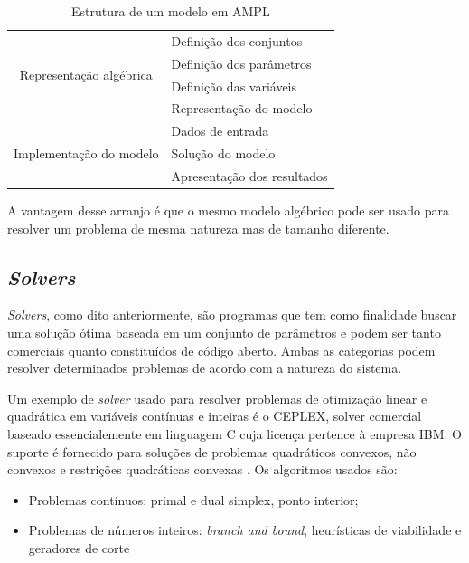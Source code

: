 \begin{table}[H]
    \centering
    \caption{Estrutura de um modelo em AMPL}
    \begin{tabular}{|c|l|}
        \hline
        \multirow{4}{*}{Representação algébrica} & Definição dos conjuntos\\ & Definição dos parâmetros\\ & Definição das variáveis\\ & Representação do modelo\\ \hline
        
        
        \multirow{3}{*}{Implementação do modelo} & Dados de entrada\\ & Solução do modelo\\ & Apresentação dos resultados\\
        \hline
    \end{tabular}
    \label{tab:estrut_AMPL}
\end{table}
    
    \vspace{8pt}
    
A vantagem desse arranjo é que o mesmo modelo algébrico pode ser usado para resolver um problema de mesma natureza mas de tamanho diferente.



\subsection{\emph{Solvers}}

\emph{Solvers}, como dito anteriormente, são programas que tem como finalidade buscar uma solução ótima baseada em um conjunto de parâmetros e podem ser tanto comerciais quanto constituídos de código aberto.
Ambas as categorias podem resolver determinados problemas de acordo com a natureza do sistema.


Um exemplo de \emph{solver} usado para resolver problemas de otimização linear e quadrática em variáveis contínuas e inteiras é o CEPLEX, solver comercial baseado essencialemente em linguagem C cuja licença pertence à empresa IBM.
O suporte é fornecido para soluções de problemas quadráticos convexos, não convexos e restrições quadráticas convexas \cite{amplCEPLEX}. Os algoritmos usados são:

\begin{itemize}
    \item Problemas contínuos: primal e dual simplex, ponto interior;
    
    \item Problemas de números inteiros: \textit{branch and bound}, heurísticas de viabilidade e geradores de corte %
\end{itemize}

